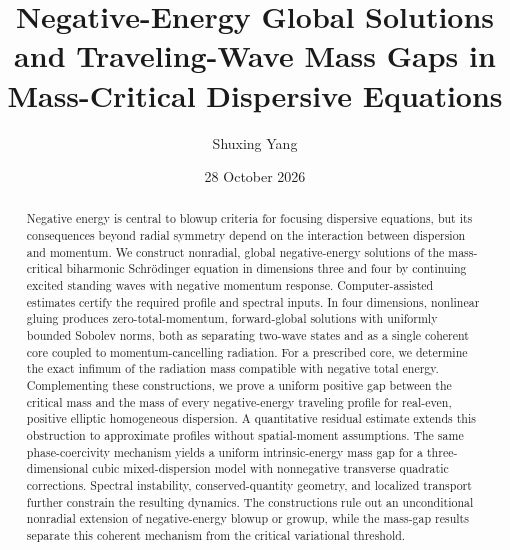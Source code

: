 \documentclass[11pt]{article}
\title{Negative-Energy Global Solutions and Traveling-Wave Mass Gaps in Mass-Critical Dispersive Equations}
\author{Shuxing Yang}
\date{28 October 2026}
\begin{document}
\maketitle
\begin{abstract}
Negative energy is central to blowup criteria for focusing dispersive equations, but its consequences beyond radial symmetry depend on the interaction between dispersion and momentum. We construct nonradial, global negative-energy solutions of the mass-critical biharmonic Schr\"odinger equation in dimensions three and four by continuing excited standing waves with negative momentum response. Computer-assisted estimates certify the required profile and spectral inputs. In four dimensions, nonlinear gluing produces zero-total-momentum, forward-global solutions with uniformly bounded Sobolev norms, both as separating two-wave states and as a single coherent core coupled to momentum-cancelling radiation. For a prescribed core, we determine the exact infimum of the radiation mass compatible with negative total energy. Complementing these constructions, we prove a uniform positive gap between the critical mass and the mass of every negative-energy traveling profile for real-even, positive elliptic homogeneous dispersion. A quantitative residual estimate extends this obstruction to approximate profiles without spatial-moment assumptions. The same phase-coercivity mechanism yields a uniform intrinsic-energy mass gap for a three-dimensional cubic mixed-dispersion model with nonnegative transverse quadratic corrections. Spectral instability, conserved-quantity geometry, and localized transport further constrain the resulting dynamics. The constructions rule out an unconditional nonradial extension of negative-energy blowup or growup, while the mass-gap results separate this coherent mechanism from the critical variational threshold.
\end{abstract}
\end{document}
